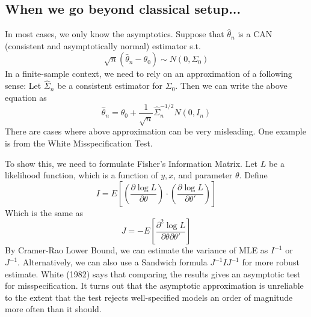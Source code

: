 \documentclass[12pt]{article}
\theoremstyle{definition}
\theoremstyle{property}
\theoremstyle{assumption}
\theoremstyle{example}
\theoremstyle{comment}
\begin{document}
\subsection{When we go beyond classical setup...}
In most cases, we only know the asymptotics. Suppose that $\hat{\theta}_n$ is a CAN (consistent and asymptotically normal) estimator s.t.
\[
\sqrt{n}(\hat{\theta}_n-\theta_0) \sim N(0,\Sigma_0)
\]
In a finite-sample context, we need to rely on an approximation of a following sense: Let $\widehat{\Sigma}_n$ be a consistent estimator for $\Sigma_0$. Then we can write the above equation as
\[
\hat{\theta}_n = \theta_0+\frac{1}{\sqrt{n}}\widehat{\Sigma}_n^{-1/2}N(0, I_n)
\]
There are cases where above approximation can be very misleading. One example is from the White Misspecification Test. \par
To show this, we need to formulate Fisher's Information Matrix. Let $L$ be a likelihood function, which is a function of $y,x$, and parameter $\theta$. Define 
\[
I=E\left[\left(\frac{\partial \log{L}}{\partial \theta}\right)\cdot\left(\frac{\partial \log{L}}{\partial \theta'}\right)\right]
\]
Which is the same as
\[
J=-E\left[\frac{\partial^2 \log{L}}{\partial \theta \partial \theta'}\right]
\]
By Cramer-Rao Lower Bound, we can estimate the variance of MLE as $I^{-1}$ or $J^{-1}$. Alternatively, we can also use a Sandwich formula $J^{-1}IJ^{-1}$ for more robust estimate. White (1982) says that comparing the results gives an asymptotic test for misspecification. It turns out that the asymptotic approximation is unreliable to the extent that the test rejects well-specified models an order of magnitude more often than it should. \par
\end{document}
